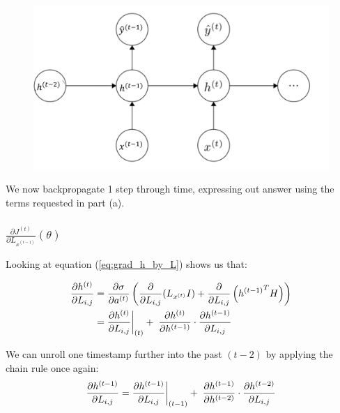 \begin{figure}
  \centering
  \includegraphics[width=0.9\linewidth]{q2/RNN_graph_updated.png}
  \label{fig:RNN_graph}
\end{figure}

We now backpropagate 1 step through time, expressing out answer using the terms requested in part (a).

\subsubsection[short]{$\frac{\partial J^{(t)}}{\partial L_{x^{(t-1)}}}(\theta)$}
Looking at equation (\ref{eq:grad_h_by_L}) shows us that:

\begin{equation} \label{eq:grad_h_by_L_induction_step}
  \begin{aligned}
    \frac{\partial h^{(t)}}{\partial L_{i,j}} &= \frac{\partial \sigma}{\partial a^{(t)}} \left( \frac{\partial}{\partial L_{i,j}} { \left(L_{x^{(t)}}I \right)}  + \frac{\partial }{\partial L_{i,j}} \left( {h^{(t-1)}}^T H \right) \right) \\
    &= \restr{\frac{\partial h^{(t)}}{\partial L_{i,j}}}{(t)} + \; \frac{\partial h^{(t)}}{\partial h^{(t-1)}} \cdot \frac{\partial h^{(t-1)}}{\partial L_{i,j}}
  \end{aligned}
\end{equation}

We can unroll one timestamp further into the past $(t-2)$ by applying the chain rule once again:
\begin{equation}
  \frac{\partial h^{(t-1)}}{\partial L_{i,j}} = \restr{\frac{\partial h^{(t-1)}}{\partial L_{i,j}}}{(t-1)} +\; \frac{\partial h^{(t-1)}}{\partial h^{(t-2)}} \cdot \frac{\partial h^{(t-2)}}{\partial L_{i,j}}
\end{equation}

